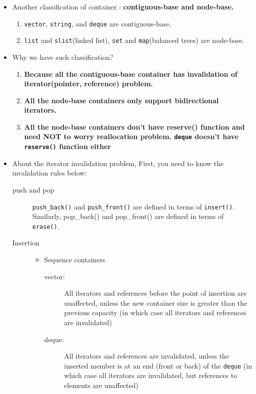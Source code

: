 \documentclass[a4paper,11pt,twoside]{book}
\begin{document}
\begin{itemize}
\item Another classification of container : \textbf{contiguous-base and node-base.}

\begin{enumerate}
\item \texttt{vector}, \texttt{string}, and \texttt{deque} are contiguous-base.
\item \texttt{list} and \texttt{slist}(linked list), \texttt{set} and \texttt{map}(balanced trees) are node-base.
\end{enumerate}

\item Why we have such classification? 
\begin{enumerate}
\item \textbf{Because all the contiguous-base container has invalidation of iterator(pointer, reference) problem. }

\item \textbf{All the node-base containers only support bidirectional iterators. }

\item \textbf{All the node-base containers don't have reserve() function and need NOT to worry reallocation problem. \texttt{deque} doesn't have \texttt{reserve()} function either }
\end{enumerate}

\item About the iterator invalidation problem,  First, you need to know the invalidation rules below: 
\begin{description}
\item[push and pop]
\texttt{push\_back()} and \texttt{push\_front()} are defined in terms of \texttt{insert()}. Similarly, pop\_back() and pop\_front() are defined in terms of \texttt{erase()}.

\item[Insertion]
\begin{itemize}
\item Sequence containers
		\begin{description}
		\item [vector:] All iterators and references before the point of insertion are unaffected, unless the new container size is greater than the previous capacity (in which case all iterators and references are invalidated)
		
		\item [deque:] All iterators and references are invalidated, unless the inserted member is at an end (front or back) of the \texttt{deque} (in which case all iterators are invalidated, but references to elements are unaffected)
		

\end{description}
\end{itemize}
\end{description}
\end{itemize}
\end{document}
